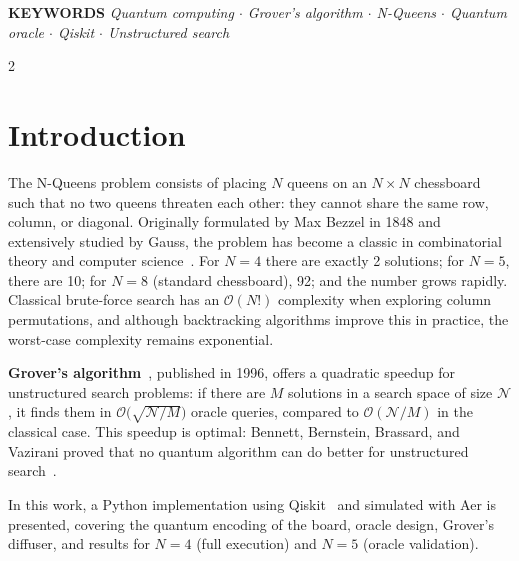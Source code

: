 \documentclass[9pt, a4paper]{extarticle}
\newcommand{\BigO}{\mathcal{O}}
\begin{document}
\vspace{0.01cm}
\noindent
\colorbox{boxbg}{%
\begin{minipage}{\dimexpr\textwidth-2\fboxsep\relax}
\vspace{2pt}
{\small\sffamily\bfseries\color{accent} KEYWORDS}\quad
{\small\itshape
Quantum computing $\cdot$ Grover's algorithm $\cdot$ N-Queens $\cdot$
Quantum oracle $\cdot$ Qiskit $\cdot$ Unstructured search}
\vspace{2pt}
\end{minipage}}

\vspace{0.07cm}

\begin{multicols}{2}
\raggedcolumns

\section{Introduction}

The N-Queens problem consists of placing $N$ queens on an $N \times N$ chessboard such that no two queens threaten each other: they cannot share the same row, column, or diagonal. Originally formulated by Max Bezzel in 1848 and extensively studied by Gauss, the problem has become a classic in combinatorial theory and computer science~\cite{nqueens}.
For $N = 4$ there are exactly 2 solutions; for $N = 5$, there are 10; for $N = 8$ (standard chessboard), 92; and the number grows rapidly. Classical brute-force search has an $\BigO(N!)$ complexity when exploring column permutations, and although backtracking algorithms improve this in practice, the worst-case complexity remains exponential.

\textbf{Grover's algorithm}~\cite{grover1996}, published in 1996, offers a quadratic speedup for unstructured search problems: if there are $M$ solutions in a search space of size $\mathcal{N}$, it finds them in $\BigO\!\big(\sqrt{\mathcal{N}/M}\big)$ oracle queries, compared to $\BigO(\mathcal{N}/M)$ in the classical case. This speedup is optimal: Bennett, Bernstein, Brassard, and Vazirani proved that no quantum algorithm can do better for unstructured search~\cite{bennett1997}.

In this work, a Python implementation using Qiskit~\cite{qiskit} and simulated with Aer is presented, covering the quantum encoding of the board, oracle design, Grover's diffuser, and results for $N = 4$ (full execution) and $N = 5$ (oracle validation).


\end{multicols}
\end{document}
